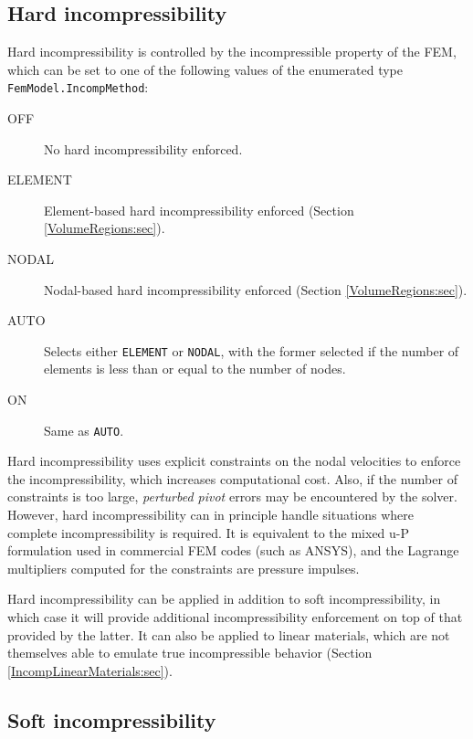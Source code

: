 \subsection{Hard incompressibility}
\label{HardIncomp:sec}

Hard incompressibility is controlled by the {\sf incompressible}
property of the FEM, which can be set to one of the following values
of the enumerated type {\tt FemModel.IncompMethod}:

\begin{description}

\item[OFF] No hard incompressibility enforced.

\item[ELEMENT] Element-based hard incompressibility enforced
(Section \ref{VolumeRegions:sec}).

\item[NODAL] Nodal-based hard incompressibility enforced
(Section \ref{VolumeRegions:sec}).

\item[AUTO] Selects either {\tt ELEMENT} or {\tt NODAL},
with the former selected if the number of elements is less than or
equal to the number of nodes.

\item[ON] Same as {\tt AUTO}.

\end{description}

Hard incompressibility uses explicit constraints on the nodal
velocities to enforce the incompressibility, which increases
computational cost. Also, if the number of constraints is too large,
{\it perturbed pivot} errors may be encountered by the solver.
However, hard incompressibility can in principle handle situations
where complete incompressibility is required. It is equivalent to the
mixed u-P formulation used in commercial FEM codes (such as ANSYS),
and the Lagrange multipliers computed for the constraints are pressure
impulses.

Hard incompressibility can be applied in addition to soft
incompressibility, in which case it will provide additional
incompressibility enforcement on top of that provided by the latter.
It can also be applied to linear materials, which are not themselves
able to emulate true incompressible behavior
(Section \ref{IncompLinearMaterials:sec}).

\subsection{Soft incompressibility}
\label{SoftIncomp:sec}

